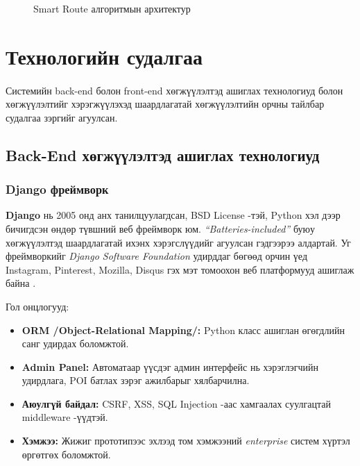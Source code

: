 \begin{figure}[H]
    \centering
    \caption{Smart Route алгоритмын архитектур}
    \label{fig:smartRoute}
\end{figure}

\section{Технологийн судалгаа}
\paragraph{} Системийн back-end болон front-end хөгжүүлэлтэд ашиглах технологиуд болон хөгжүүлэлтийг хэрэгжүүлэхэд шаардлагатай хөгжүүлэлтийн орчны тайлбар судалгаа зэргийг агуулсан.

\subsection{Back-End хөгжүүлэлтэд ашиглах технологиуд}

\subsubsection{Django фреймворк}
\par
\textbf{Django} нь 2005 онд анх танилцуулагдсан, BSD License -тэй, Python хэл дээр бичигдсэн өндөр түвшний веб фреймворк юм. \textit{“Batteries-included”} буюу хөгжүүлэлтэд шаардлагатай ихэнх хэрэгслүүдийг агуулсан гэдгээрээ алдартай. Уг фреймворкийг \textit{Django Software Foundation} удирддаг бөгөөд орчин үед Instagram, Pinterest, Mozilla, Disqus гэх мэт томоохон веб платформууд ашиглаж байна \cite{django}.

\par Гол онцлогууд:
\begin{itemize}
    \item \textbf{ORM /Object-Relational Mapping/: }Python класс ашиглан өгөгдлийн санг удирдах боломжтой.
    \item \textbf{Admin Panel: }Автоматаар үүсдэг админ интерфейс нь хэрэглэгчийн удирдлага, POI батлах зэрэг ажилбарыг хялбарчилна.
    \item \textbf{Аюулгүй байдал: }CSRF, XSS, SQL Injection -аас хамгаалах суулгацтай middleware -үүдтэй.
    \item \textbf{Хэмжээ: }Жижиг прототипээс эхлээд том хэмжээний \textit{enterprise} систем хүртэл өргөтгөх боломжтой.
\end{itemize}

